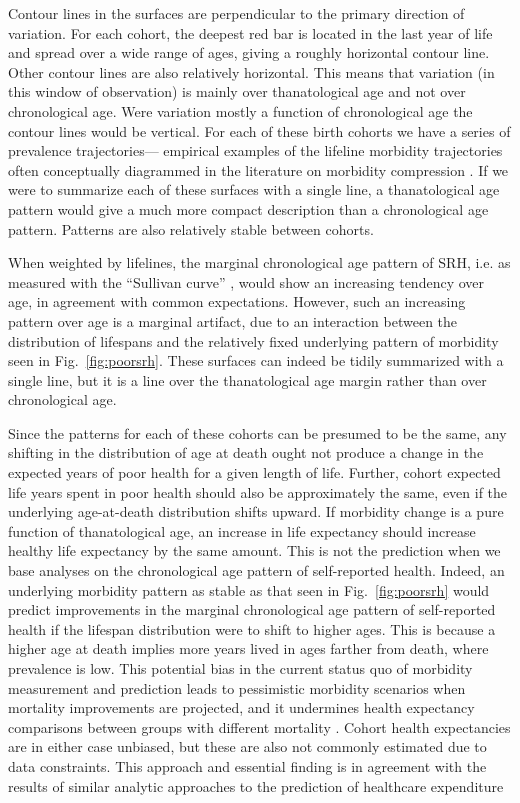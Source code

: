 \documentclass[12pt,oneside,a4paper,doublespacing]{article} %
\theoremstyle{definition}
\begin{document}
 Contour lines in the surfaces are perpendicular to the primary direction of
 variation.
 For each cohort, the deepest red bar is located in the last
 year of life and spread over a wide range of ages, giving a roughly horizontal contour line.
Other contour lines are also relatively horizontal. This means that variation
(in this window of observation) is mainly over thanatological age and not over
chronological age. Were variation mostly a function of chronological age the
contour lines would be vertical. For each of these birth cohorts we have a series of prevalence trajectories---
empirical examples of the lifeline morbidity trajectories often conceptually
diagrammed in the literature on morbidity compression
\citep[e.g.,][]{fries2005frailty}. If we were to summarize each of
these surfaces with a single line, a thanatological age pattern would give a
much more compact description than a chronological age pattern. Patterns are
also relatively stable between cohorts.

When weighted by lifelines, the marginal chronological age pattern of SRH,
i.e. as measured with the ``Sullivan curve'' \citep{Sullivan1970}, would show an
increasing tendency over age, in agreement with common expectations.
However, such an increasing pattern over age is a marginal artifact, due to an
interaction between the distribution of lifespans and the relatively fixed underlying
pattern of morbidity seen in Fig.~\ref{fig:poorsrh}. These surfaces can indeed
be tidily summarized with a single line, but it is a line over the
thanatological age margin rather than over chronological age. 

Since the patterns for each of these cohorts can be presumed to be the same, any
shifting in the distribution of age at death ought not produce a change in the
expected years of poor health for a given length of life. Further, cohort
expected life years spent in poor health should also be approximately the same,
even if the underlying age-at-death distribution shifts upward. If morbidity
change is a pure function of thanatological age, an increase in life expectancy
should increase healthy life expectancy by the same amount. This is not the
prediction when we base analyses on the chronological age pattern of
self-reported health. Indeed, an underlying morbidity pattern as stable as
that seen in Fig.~\ref{fig:poorsrh} would predict improvements in the marginal
chronological age pattern of self-reported health if the lifespan distribution
were to shift to higher ages. This is because a higher age at death implies
more years lived in ages farther from death, where prevalence is low.
This potential bias in the current status quo of morbidity measurement and
prediction leads to pessimistic morbidity scenarios when mortality improvements
are projected, and it undermines health expectancy comparisons between groups
with different mortality \citep{vanRaalte2015HLE}.
Cohort health expectancies are in either case unbiased, but these are also not
commonly estimated due to data constraints. This approach and essential finding
is in agreement with the results of similar analytic approaches to the
prediction of healthcare expenditure
\citep[e.g.,][]{miller2001increasing,Geue2014}
\end{document}
